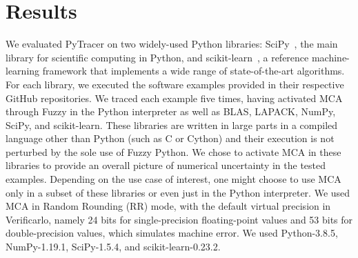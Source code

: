 \documentclass[10pt,journal,compsoc]{IEEEtran}
\newcommand{\pytracer}[0]{PyTracer\xspace}
\begin{document}
\section{Results}

We evaluated \pytracer on two widely-used Python libraries:
SciPy~\cite{virtanen2020scipy}, the main library for scientific computing in
Python, and  scikit-learn~\cite{pedregosa2011scikit}, a reference
machine-learning framework that implements a wide range of state-of-the-art
algorithms. For each library, we executed the software examples provided in
their respective GitHub repositories. We traced each example five times, having
activated MCA through Fuzzy in the Python interpreter as well as BLAS, LAPACK,
NumPy, SciPy, and scikit-learn. These libraries are written in large parts in a
compiled language other than Python (such as C or Cython) and their execution is
not perturbed by the sole use of Fuzzy Python. We chose to activate MCA in these
libraries to provide an overall picture of numerical uncertainty in the tested
examples. Depending on the use case of interest, one might choose to use MCA
only in a subset of these libraries or even just in the Python interpreter. We
used MCA in Random Rounding (RR) mode, with the default virtual precision in
Verificarlo, namely 24 bits for single-precision floating-point values and 53
bits for double-precision values, which simulates machine error. We used
Python-3.8.5, NumPy-1.19.1, SciPy-1.5.4, and scikit-learn-0.23.2.
\end{document}
